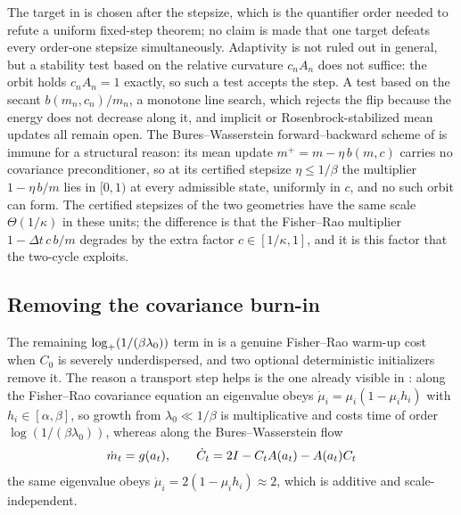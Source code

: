 \begin{remark}\label{rem:cycle-scope}
    The target in  is chosen after the stepsize, which is the quantifier
    order needed to refute a uniform fixed-step theorem; no claim is made that one target
    defeats every order-one stepsize simultaneously. Adaptivity is not ruled out in general,
    but a stability test based on the relative curvature $c_nA_n$ does not suffice: the orbit
    holds $c_nA_n=1$ exactly, so such a test accepts the step. A test based on the secant
    $b(m_n,c_n)/m_n$, a monotone line search, which rejects the flip because the energy does
    not decrease along it, and implicit or Rosenbrock-stabilized mean updates all remain
    open. The Bures--Wasserstein forward--backward scheme of
    \citet{lambert2022variational,diao2023forward} is immune for a structural reason: its
    mean update $m^+=m-\eta\,b(m,c)$ carries no covariance preconditioner, so at its
    certified stepsize $\eta\leq1/\beta$ the multiplier $1-\eta\,b/m$ lies in $[0,1)$ at
    every admissible state, uniformly in $c$, and no such orbit can form. The certified
    stepsizes of the two geometries have the same scale $\Theta(1/\kappa)$ in these units;
    the difference is that the Fisher--Rao multiplier $1-\Delta t\,c\,b/m$ degrades by the
    extra factor $c\in[1/\kappa,1]$, and it is this factor that the two-cycle exploits.
\end{remark}

\subsection{Removing the covariance burn-in}
\label{subsec:burnin}

The remaining $\log_+(1/(\beta\lambda_0))$ term in
 is a genuine Fisher--Rao warm-up cost when
$C_0$ is severely underdispersed, and two optional deterministic initializers remove it. The
reason a transport step helps is the one already visible in : along the
Fisher--Rao covariance equation an eigenvalue obeys $\dot\mu_i=\mu_i(1-\mu_ih_i)$ with
$h_i\in[\alpha,\beta]$, so growth from $\lambda_0\ll1/\beta$ is multiplicative and costs time
of order $\log(1/(\beta\lambda_0))$, whereas along the Bures--Wasserstein flow
\begin{equation}\label{eq:W-flow}
    \dot m_t=g(a_t),
    \qquad
    \dot C_t=2I-C_tA(a_t)-A(a_t)C_t
\end{equation}
the same eigenvalue obeys $\dot\mu_i=2(1-\mu_ih_i)\approx2$, which is additive and
scale-independent.

